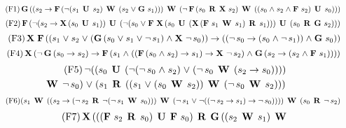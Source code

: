 \begin{table}[h]
\begin{footnotesize}

\begin{equation}\tag{F1}
\G ((s_2 \mathrel{\rightarrow} \F (\mathop{\neg}(s_1 \U  s_2) \W  (s_2 \mathrel{\vee} \G s_1))) \W  (\mathop{\neg}\F (s_0 \R  \X s_2) \W  ((s_0 \mathrel{\wedge} s_2 \mathrel{\wedge} \F s_2) \U  s_0)))
\end{equation}
%
\squeeze
%
\begin{equation}\tag{F2}
\F (\mathop{\neg}(s_2 \mathrel{\rightarrow} \X (s_0 \U  s_1)) \U  (\mathop{\neg}(s_0 \mathrel{\vee} \F \X (s_0 \U  (\X (\F s_1 \W  s_1) \R  s_1))) 
\U  (s_0 \R  \G s_2)))
\end{equation}
%
\squeeze
%
\begin{equation}\tag{F3}
\X \F ((s_1 \mathrel{\vee} s_2 \mathrel{\vee} (\G (s_0 \mathrel{\vee} s_1 \mathrel{\vee} \mathop{\neg}s_1) \mathrel{\wedge} \X \mathop{\neg}s_0)) \mathrel{\rightarrow} \\
((\mathop{\neg}s_0 \mathrel{\rightarrow} (s_0 \mathrel{\wedge} \mathop{\neg}s_1)) \mathrel{\wedge} \G s_0))
\end{equation}
%
\squeeze
%
\begin{equation}\tag{F4}
\X (\mathop{\neg}\G (s_0 \mathrel{\rightarrow} s_2) \mathrel{\rightarrow} \F (s_1 \mathrel{\wedge} ((\F (s_0 \mathrel{\wedge} s_2) \mathrel{\rightarrow} s_1) \mathrel{\rightarrow} \X \mathop{\neg}s_2) \mathrel{\wedge} \G (s_2 \mathrel{\rightarrow} (s_2 \mathrel{\wedge} \F s_1))))
\end{equation}
%
\squeezemore
%
\begin{multline}\tag{F5}
\mathop{\neg}((s_0 \U  (\mathop{\neg}(\mathop{\neg}s_0 \mathrel{\wedge} s_2) \mathrel{\vee} (\mathop{\neg}s_0 \W  (s_2 \mathrel{\rightarrow} s_0)))) \\
\W  \mathop{\neg}s_0) \mathrel{\vee}
(s_1 \R  ((s_1 \mathrel{\vee} (s_0 \W  s_2)) \W  (\mathop{\neg}s_0 \W  s_2)))
\end{multline}
%
\squeeze
%
\begin{equation}\tag{F6}
(s_1 \W  ((s_2 \mathrel{\rightarrow} (\mathop{\neg}s_2 \R  \mathop{\neg}(\mathop{\neg}s_1 \W  s_0))) \W  (\mathop{\neg}s_1 \mathrel{\vee} \mathop{\neg}((\mathop{\neg}s_2 \mathrel{\rightarrow} s_1) \mathrel{\rightarrow} \mathop{\neg}s_0)))) \W  (s_0 \R  \mathop{\neg}s_2)
\end{equation}
%
\squeezemore
%
\begin{multline}\tag{F7}
\X (((\F s_2 \R  s_0) \U  \F s_0) \R  \G ((s_2 \W  s_1) \W  \\

\end{multline}
\end{footnotesize}
\end{table}
